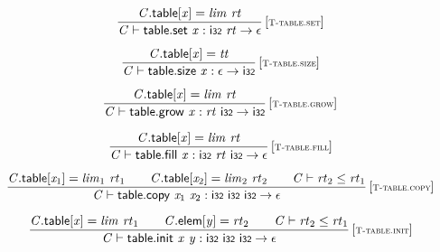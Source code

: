 $$
\begin{array}{@{}c@{}}\displaystyle
\frac{
{\mathit{C}}.\mathsf{table}[{\mathit{x}}] = {\mathit{lim}}~{\mathit{rt}}
}{
{\mathit{C}} \vdash \mathsf{table.set}~{\mathit{x}} : \mathsf{i{\scriptstyle32}}~{\mathit{rt}} \rightarrow \epsilon
} \, {[\textsc{\scriptsize T{-}table.set}]}
\qquad
\end{array}
$$

$$
\begin{array}{@{}c@{}}\displaystyle
\frac{
{\mathit{C}}.\mathsf{table}[{\mathit{x}}] = {\mathit{tt}}
}{
{\mathit{C}} \vdash \mathsf{table.size}~{\mathit{x}} : \epsilon \rightarrow \mathsf{i{\scriptstyle32}}
} \, {[\textsc{\scriptsize T{-}table.size}]}
\qquad
\end{array}
$$

$$
\begin{array}{@{}c@{}}\displaystyle
\frac{
{\mathit{C}}.\mathsf{table}[{\mathit{x}}] = {\mathit{lim}}~{\mathit{rt}}
}{
{\mathit{C}} \vdash \mathsf{table.grow}~{\mathit{x}} : {\mathit{rt}}~\mathsf{i{\scriptstyle32}} \rightarrow \mathsf{i{\scriptstyle32}}
} \, {[\textsc{\scriptsize T{-}table.grow}]}
\qquad
\end{array}
$$

$$
\begin{array}{@{}c@{}}\displaystyle
\frac{
{\mathit{C}}.\mathsf{table}[{\mathit{x}}] = {\mathit{lim}}~{\mathit{rt}}
}{
{\mathit{C}} \vdash \mathsf{table.fill}~{\mathit{x}} : \mathsf{i{\scriptstyle32}}~{\mathit{rt}}~\mathsf{i{\scriptstyle32}} \rightarrow \epsilon
} \, {[\textsc{\scriptsize T{-}table.fill}]}
\qquad
\end{array}
$$

$$
\begin{array}{@{}c@{}}\displaystyle
\frac{
{\mathit{C}}.\mathsf{table}[{\mathit{x}}_{{1}}] = {\mathit{lim}}_{{1}}~{\mathit{rt}}_{{1}}
 \qquad
{\mathit{C}}.\mathsf{table}[{\mathit{x}}_{{2}}] = {\mathit{lim}}_{{2}}~{\mathit{rt}}_{{2}}
 \qquad
{\mathit{C}} \vdash {\mathit{rt}}_{{2}} \leq {\mathit{rt}}_{{1}}
}{
{\mathit{C}} \vdash \mathsf{table.copy}~{\mathit{x}}_{{1}}~{\mathit{x}}_{{2}} : \mathsf{i{\scriptstyle32}}~\mathsf{i{\scriptstyle32}}~\mathsf{i{\scriptstyle32}} \rightarrow \epsilon
} \, {[\textsc{\scriptsize T{-}table.copy}]}
\qquad
\end{array}
$$

$$
\begin{array}{@{}c@{}}\displaystyle
\frac{
{\mathit{C}}.\mathsf{table}[{\mathit{x}}] = {\mathit{lim}}~{\mathit{rt}}_{{1}}
 \qquad
{\mathit{C}}.\mathsf{elem}[{\mathit{y}}] = {\mathit{rt}}_{{2}}
 \qquad
{\mathit{C}} \vdash {\mathit{rt}}_{{2}} \leq {\mathit{rt}}_{{1}}
}{
{\mathit{C}} \vdash \mathsf{table.init}~{\mathit{x}}~{\mathit{y}} : \mathsf{i{\scriptstyle32}}~\mathsf{i{\scriptstyle32}}~\mathsf{i{\scriptstyle32}} \rightarrow \epsilon
} \, {[\textsc{\scriptsize T{-}table.init}]}
\qquad
\end{array}
$$

